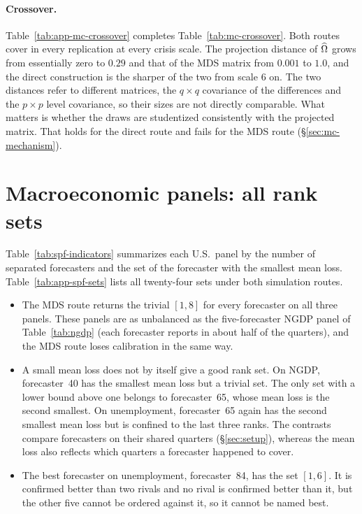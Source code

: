 \begin{appendix}
\paragraph{Crossover.} Table~\ref{tab:app-mc-crossover} completes
Table~\ref{tab:mc-crossover}. Both routes cover in every replication at every crisis
scale. The projection distance of $\widehat{\Omega}$ grows from essentially zero to $0.29$ and
that of the MDS matrix from $0.001$ to $1.0$, and the direct construction is the
sharper of the two from scale $6$ on. The two distances refer to different matrices, the
$q\times q$ covariance of the differences and the $p\times p$ level covariance, so their
sizes are not directly comparable.
What matters is whether the draws are studentized consistently with the projected
matrix. That holds for the direct route and fails for the MDS route
(\S\ref{sec:mc-mechanism}).

\tabAppMcCoverage
\tabAppMcWidth
\tabAppMcCrossover

\section{Macroeconomic panels: all rank sets}
\label{app:add-macro}

Table~\ref{tab:spf-indicators} summarizes each U.S.\ panel by the number of separated
forecasters and the set of the forecaster with the smallest mean loss.
Table~\ref{tab:app-spf-sets} lists all twenty-four sets under both simulation routes.
\begin{itemize}[leftmargin=*]
  \item The MDS route returns the trivial $[1,8]$ for every forecaster on all three
    panels. These panels are as unbalanced as the five-forecaster NGDP panel of
    Table~\ref{tab:ngdp} (each forecaster reports in about half of the quarters), and
    the MDS route loses calibration in the same way.
  \item A small mean loss does not by itself give a good rank set. On NGDP, forecaster~40
    has the smallest mean loss but a trivial set. The only set with a lower bound above
    one belongs to forecaster~65, whose mean loss is the second smallest. On
    unemployment, forecaster~65 again has the second smallest mean loss but is confined
    to the last three ranks. The contrasts compare forecasters on their shared quarters
    (\S\ref{sec:setup}), whereas the mean loss also reflects which quarters a forecaster
    happened to cover.
  \item The best forecaster on unemployment, forecaster~84, has the set $[1,6]$. It is
    confirmed better than two rivals and no rival is confirmed better than it, but the
    other five cannot be ordered against it, so it cannot be named best.
\end{itemize}


\end{appendix}
